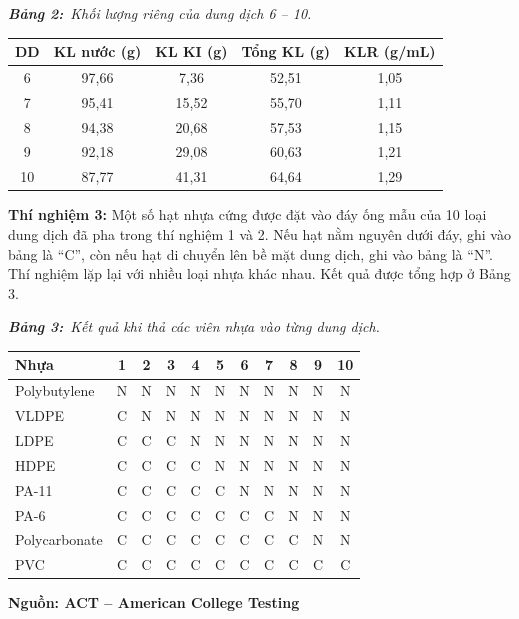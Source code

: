 \documentclass[12pt,a4paper,twoside]{article}
\newcommand{\tablecaption}[2]{%
    \par\vspace{2pt}%
    {\centering\textbf{\textit{Bảng #1:}}~\textit{#2}\par}%
    \vspace{0pt}%
}
\newenvironment{readingpassage}[1][]{%
    \begin{tcolorbox}[enhanced, colback=grayLight, colframe=secondaryBlue,
        coltitle=textDark, fonttitle=\bfseries, title={#1},
        rounded corners, arc=3mm, boxrule=1pt,
        left=15pt, right=15pt, top=10pt, bottom=10pt,
        breakable, before skip=10pt, after skip=10pt, drop fuzzy shadow]
    \setstretch{1.3}
}{\end{tcolorbox}}
\begin{document}
\begin{readingpassage}[]
\tablecaption{2}{Khối lượng riêng của dung dịch 6 -- 10.}
\renewcommand{\arraystretch}{1.3}
{\small
{}%
\begin{center}
\begin{tabular}{|c|c|c|c|c|}
\hline
\rowcolor{primaryBlue!12}
\textbf{DD} & \textbf{KL nước (g)} & \textbf{KL KI (g)} & \textbf{Tổng KL (g)} & \textbf{KLR (g/mL)} \\
\hline
6 & 97,66 & 7,36 & 52,51 & 1,05 \\
\hline
7 & 95,41 & 15,52 & 55,70 & 1,11 \\
\hline
8 & 94,38 & 20,68 & 57,53 & 1,15 \\
\hline
9 & 92,18 & 29,08 & 60,63 & 1,21 \\
\hline
10 & 87,77 & 41,31 & 64,64 & 1,29 \\
\hline
\end{tabular}
\end{center}
}

\vspace{6pt}
\textbf{Thí nghiệm 3:} Một số hạt nhựa cứng được đặt vào đáy ống mẫu của 10 loại dung dịch đã pha trong thí nghiệm 1 và 2. Nếu hạt nằm nguyên dưới đáy, ghi vào bảng là ``C'', còn nếu hạt di chuyển lên bề mặt dung dịch, ghi vào bảng là ``N''. Thí nghiệm lặp lại với nhiều loại nhựa khác nhau. Kết quả được tổng hợp ở Bảng 3.

\tablecaption{3}{Kết quả khi thả các viên nhựa vào từng dung dịch.}
\renewcommand{\arraystretch}{1.3}
{\footnotesize
{}%
\begin{center}
\begin{tabular}{|l|c|c|c|c|c|c|c|c|c|c|}
\hline
\rowcolor{primaryBlue!12}
\textbf{Nhựa} & \textbf{1} & \textbf{2} & \textbf{3} & \textbf{4} & \textbf{5} & \textbf{6} & \textbf{7} & \textbf{8} & \textbf{9} & \textbf{10} \\
\hline
Polybutylene & N & N & N & N & N & N & N & N & N & N \\
\hline
VLDPE & C & N & N & N & N & N & N & N & N & N \\
\hline
LDPE & C & C & C & N & N & N & N & N & N & N \\
\hline
HDPE & C & C & C & C & N & N & N & N & N & N \\
\hline
PA-11 & C & C & C & C & C & N & N & N & N & N \\
\hline
PA-6 & C & C & C & C & C & C & C & N & N & N \\
\hline
Polycarbonate & C & C & C & C & C & C & C & C & N & N \\
\hline
PVC & C & C & C & C & C & C & C & C & C & C \\
\hline
\end{tabular}
\end{center}
}

\hfill\textbf{Nguồn: ACT -- American College Testing}
\end{readingpassage}
\end{document}
